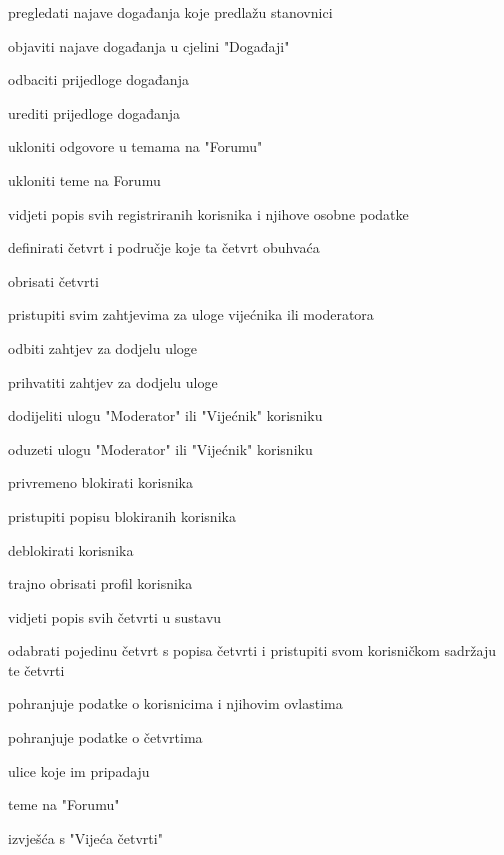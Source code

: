 \begin{packed_enum}
				\item  {}
				\begin{packed_enum}
					\item pregledati najave događanja koje predlažu stanovnici
					\item objaviti najave događanja u cjelini "Događaji"
					\item odbaciti prijedloge događanja
					\item urediti prijedloge događanja
					\item ukloniti odgovore u temama na "Forumu"
					\item ukloniti teme na Forumu
				\end{packed_enum}
				
				\item  {}
				\begin{packed_enum}
					\item vidjeti popis svih registriranih korisnika i njihove osobne podatke
					\item definirati četvrt i područje koje ta četvrt obuhvaća
					\item obrisati četvrti
					\item pristupiti svim zahtjevima za uloge vijećnika ili moderatora
					\item odbiti zahtjev za dodjelu uloge
					\item prihvatiti zahtjev za dodjelu uloge
					\item dodijeliti ulogu "Moderator" ili "Vijećnik" korisniku
					\item oduzeti ulogu "Moderator" ili "Vijećnik" korisniku
					\item privremeno blokirati korisnika
					\item pristupiti popisu blokiranih korisnika
					\item deblokirati korisnika
					\item trajno obrisati profil korisnika
					\item vidjeti popis svih četvrti u sustavu
					\item odabrati pojedinu četvrt s popisa četvrti i pristupiti svom korisničkom sadržaju te četvrti
				\end{packed_enum}
				
				\item  {}
				\begin{packed_enum}
					\item pohranjuje podatke o korisnicima i njihovim ovlastima
					\item pohranjuje podatke o četvrtima
					\begin{packed_enum}
						\item ulice koje im pripadaju
						\item teme na "Forumu"
						\item izvješća s "Vijeća četvrti"
					\end{packed_enum}
				\end{packed_enum}
				
			\end{packed_enum}
			
